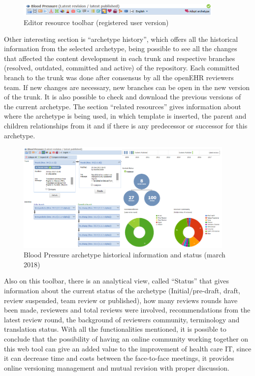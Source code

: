 \documentclass[mim_thesis.tex]{subfiles}
\begin{document}
\begin{figure}[H]
	\centering
    \includegraphics[width=0.9\textwidth]{img/editor_resource_toolbar.PNG}
	\caption{Editor resource toolbar (registered user version) }
	\label{fig:editor_resource_toolbar}
\end{figure}

Other interesting section is “archetype history”, which offers all the historical information from the selected archetype, being possible to see all the changes that affected the content development in each trunk and respective branches (resolved, outdated, committed and active) of the repository. Each committed branch to the trunk was done after consensus by all the openEHR reviewers team. If new changes are necessary, new branches can be open in the new version of the trunk. It is also possible to check and download the previous versions of the current archetype. The section “related resources” gives information about where the archetype is being used, in which template is inserted, the parent and children relationships from it and if there is any predecessor or successor for this archetype.  

\begin{figure}[H]
	\centering
    \includegraphics[width=0.95\textwidth]{img/bp_history.PNG}
	\caption{ Blood Pressure archetype historical information and status (march 2018)}
	\label{fig:bp_history}
\end{figure}

Also on this toolbar, there is an analytical view, called “Status” that gives information about the current status of the archetype (Initial/pre-draft, draft, review suspended, team review or published), how many reviews rounds have been made, reviewers and total reviews were involved, recommendations from the latest review round, the background of reviewers community, terminology and translation status. With all the functionalities mentioned, it is possible to conclude that the possibility of having an online community working together on this web tool can give an added value to the improvement of health care IT, since it can decrease time and costs between the face-to-face meetings, it provides online versioning management and mutual revision with proper discussion.
\end{document}
